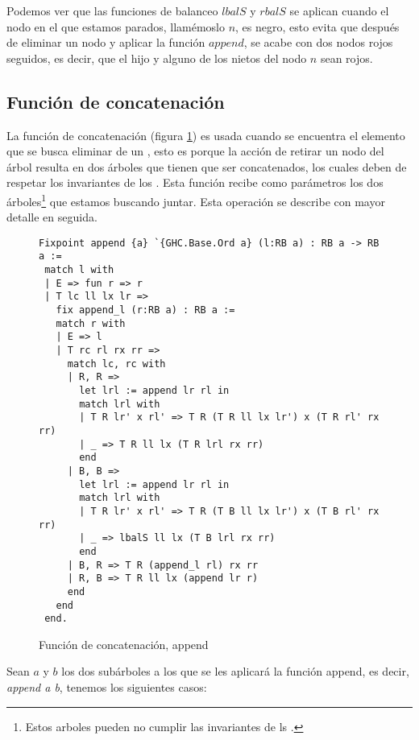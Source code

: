 Podemos ver que las funciones de balanceo $lbalS$ y $rbalS$ se aplican cuando el nodo en el que
estamos parados, llamémoslo $n$, es negro, esto evita que después de eliminar un nodo y aplicar la
funci\'on $append$, se acabe con dos nodos rojos seguidos, es decir, que el hijo y alguno de los
nietos del nodo $n$ sean rojos.

\subsection{Funci\'on de concatenaci\'on}

La funci\'on de concatenación (figura \ref{func_app}) es usada cuando se encuentra el elemento que
se busca eliminar de un {\arn}, esto es porque la acci\'on de retirar un nodo del \'arbol resulta
en dos \'arboles que tienen que ser concatenados, los cuales deben de respetar los invariantes de
los {\arns}. Esta funci\'on recibe como parámetros los dos \'arboles\footnote{Estos arboles pueden
no cumplir las invariantes de ls {\arns}.} que estamos buscando juntar. Esta operación se describe
con mayor detalle en seguida.

\begin{figure}
\centering
\captionsetup{justification=centering}
\begin{verbatim}
Fixpoint append {a} `{GHC.Base.Ord a} (l:RB a) : RB a -> RB a :=
 match l with
 | E => fun r => r
 | T lc ll lx lr =>
   fix append_l (r:RB a) : RB a :=
   match r with
   | E => l
   | T rc rl rx rr =>
     match lc, rc with
     | R, R =>
       let lrl := append lr rl in
       match lrl with
       | T R lr' x rl' => T R (T R ll lx lr') x (T R rl' rx rr)
       | _ => T R ll lx (T R lrl rx rr)
       end
     | B, B =>
       let lrl := append lr rl in
       match lrl with
       | T R lr' x rl' => T R (T B ll lx lr') x (T B rl' rx rr)
       | _ => lbalS ll lx (T B lrl rx rr)
       end
     | B, R => T R (append_l rl) rx rr
     | R, B => T R ll lx (append lr r)
     end
   end
 end.
\end{verbatim}
\caption{Funci\'on de concatenaci\'on, append}
\label{func_app}
\end{figure}


Sean $a$ y $b$ los dos subárboles a los que se les aplicar\'a la funci\'on append, es decir,
\textit{append a b}, tenemos los siguientes casos:

